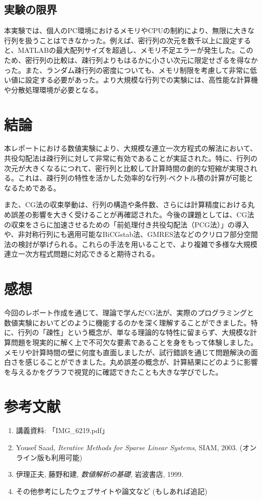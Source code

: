 \documentclass{article}
\begin{document}
\subsection{実験の限界}
本実験では、個人のPC環境におけるメモリやCPUの制約により、無限に大きな行列を扱うことはできなかった。例えば、密行列の次元を数千以上に設定すると、MATLABの最大配列サイズを超過し、メモリ不足エラーが発生した。このため、密行列の比較は、疎行列よりもはるかに小さい次元に限定せざるを得なかった。また、ランダム疎行列の密度についても、メモリ制限を考慮して非常に低い値に設定する必要があった。より大規模な行列での実験には、高性能な計算機や分散処理環境が必要となる。

\section{結論}
本レポートにおける数値実験により、大規模な連立一次方程式の解法において、共役勾配法は疎行列に対して非常に有効であることが実証された。特に、行列の次元が大きくなるにつれて、密行列と比較して計算時間の劇的な短縮が実現される。これは、疎行列の特性を活かした効率的な行列-ベクトル積の計算が可能となるためである。

また、CG法の収束挙動は、行列の構造や条件数、さらには計算精度における丸め誤差の影響を大きく受けることが再確認された。今後の課題としては、CG法の収束をさらに加速させるための「前処理付き共役勾配法（PCG法）」の導入や、非対称行列にも適用可能なBiCGstab法、GMRES法などのクリロフ部分空間法の検討が挙げられる。これらの手法を用いることで、より複雑で多様な大規模連立一次方程式問題に対応できると期待される。

\section{感想}
今回のレポート作成を通じて、理論で学んだCG法が、実際のプログラミングと数値実験においてどのように機能するのかを深く理解することができました。特に、行列の「疎性」という概念が、単なる理論的な特性に留まらず、大規模な計算問題を現実的に解く上で不可欠な要素であることを身をもって体験しました。メモリや計算時間の壁に何度も直面しましたが、試行錯誤を通じて問題解決の面白さを感じることができました。丸め誤差の概念が、計算結果にどのように影響を与えるかをグラフで視覚的に確認できたことも大きな学びでした。

\section{参考文献}
\begin{enumerate}
    \item 講義資料: 「IMG\_6219.pdf」
    \item Yousef Saad, \textit{Iterative Methods for Sparse Linear Systems}, SIAM, 2003. (オンライン版も利用可能)
    \item 伊理正夫, 藤野和建, \textit{数値解析の基礎}, 岩波書店, 1999.
    \item その他参考にしたウェブサイトや論文など (もしあれば追記)
\end{enumerate}
\end{document}
